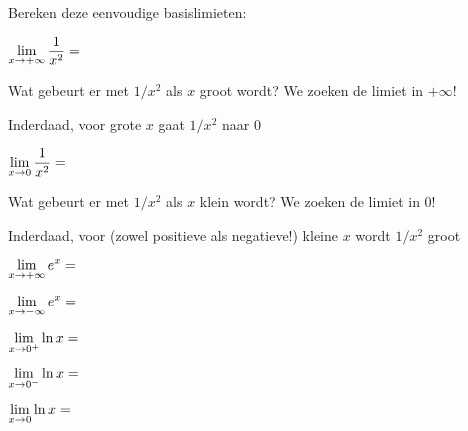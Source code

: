\documentclass{ximera}
\begin{document}
\begin{exercise} Bereken deze eenvoudige basislimieten:
		
		\begin{question} \def\isC{correct}   $\limxi    \frac{1}{x^2}= \;$   \localoefoptions 
			\begin{feedback}[attempt]Wat gebeurt er met $1/x^2$ als $x$ groot wordt? We zoeken de limiet in $+\infty$!
            \end{feedback}
			\begin{feedback}[correct]Inderdaad, voor grote $x$  gaat $1/x^2$ naar $0$
			\end{feedback}	
		\end{question}
    
		\begin{question} \def\isA{correct}   $\limx     \frac{1}{x^2}= \;$   \localoefoptions 
            \begin{feedback}[attempt]Wat gebeurt er met $1/x^2$ als $x$ klein wordt? We zoeken de limiet in $0$!
            \end{feedback}
			\begin{feedback}[correct]Inderdaad, voor (zowel positieve als negatieve!) kleine $x$ wordt $1/x^2$ groot 
			\end{feedback}		
		\end{question}

		\begin{question} \def\isA{correct}   $\limxi    e^x = \;$            \localoefoptions 
        \end{question}

		\begin{question} \def\isB{correct}   $\limxmi   e^x = \;$            \localoefoptions 
        \end{question}

		\begin{question} \def\isB{correct}   $\rlimx    \ln x = \;$          \localoefoptions 
        \end{question}

		\begin{question} \def\isE{correct}   $\llimx    \ln x = \;$          \localoefoptions 
        \end{question}

		\begin{question} \def\isE{correct}   $\limx    \ln x = \;$          \localoefoptions 
        \end{question}

\end{exercise}
\end{document}
